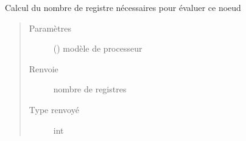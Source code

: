 \documentclass[letterpaper,10pt,french]{sphinxmanual}
\begin{document}
\begin{fulllineitems}
\begin{fulllineitems}
\begin{quote}
\begin{description}
\end{description}\end{quote}

\end{fulllineitems}


\begin{fulllineitems}
\label{\detokenize{comparaisonexpressionnodes:comparaisonexpressionnodes.ComparaisonExpressionNode.getRegisterCost}}
Calcul du nombre de registre nécessaires pour évaluer ce noeud
\begin{quote}\begin{description}
\item[{Paramètres}] \leavevmode
{} ({\hyperref[\detokenize{processorengine:processorengine.ProcessorEngine}]{}}) \textendash{} modèle de processeur

\item[{Renvoie}] \leavevmode
nombre de registres

\item[{Type renvoyé}] \leavevmode
int


\end{description}
\end{quote}
\end{fulllineitems}
\end{fulllineitems}
\end{document}
